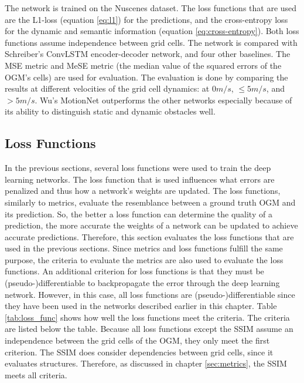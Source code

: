 The network is trained on the Nuscenes \cite{caesar2020nuscenes} dataset. The loss functions that are used are the L1-loss (equation \ref{eq:l1}) for the predictions, and the cross-entropy loss for the dynamic and semantic information (equation \ref{eq:cross-entropy}). Both loss functions assume independence between grid cells. The network is compared with Schreiber's \cite{schreiber2019long} \gls{ConvLSTM} encoder-decoder network, and four other baselines. The \gls{MSE} metric and \gls{MeSE} metric (the median value of the squared errors of the \gls{OGM}'s cells) are used for evaluation. The evaluation is done by comparing the results at different velocities of the grid cell dynamics: at $0 m/s$, $\leq 5 m/s$, and $> 5 m/s$. Wu's \cite{wu2020motionnet} MotionNet outperforms the other networks especially because of its ability to distinguish static and dynamic obstacles well.  

\subsection{Loss Functions} \label{subsec:lossfunc}
In the previous sections, several loss functions were used to train the deep learning networks. The loss function that is used influences what errors are penalized and thus how a network's weights are updated. The loss functions, similarly to metrics, evaluate the resemblance between a ground truth \gls{OGM} and its prediction. So, the better a loss function can determine the quality of a prediction, the more accurate the weights of a network can be updated to achieve accurate predictions. Therefore, this section evaluates the loss functions that are used in the previous sections. Since metrics and loss functions fulfill the same purpose, the criteria to evaluate the metrics are also used to evaluate the loss functions. An additional criterion for loss functions is that they must be (pseudo-)differentiable to backpropagate the error through the deep learning network. However, in this case, all loss functions are (pseudo-)differentiable since they have been used in the networks described earlier in this chapter. Table \ref{tab:loss_func} shows how well the loss functions meet the criteria. The criteria are listed below the table. Because all loss functions except the \gls{SSIM} assume an independence between the grid cells of the \gls{OGM}, they only meet the first criterion. The \gls{SSIM} does consider dependencies between grid cells, since it evaluates structures. Therefore, as discussed in chapter \ref{sec:metrics}, the \gls{SSIM} meets all criteria. 

